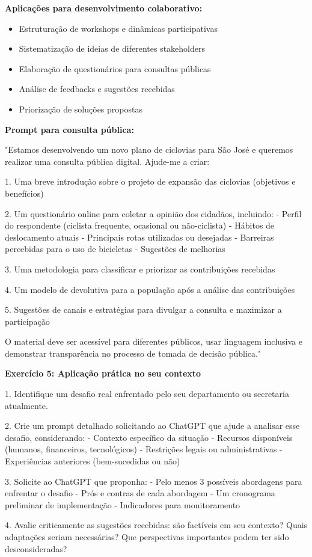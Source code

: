 \documentclass[12pt,a4paper]{book}
\begin{document}
\textbf{Aplicações para desenvolvimento colaborativo:}
\begin{itemize}
    \item Estruturação de workshops e dinâmicas participativas
    \item Sistematização de ideias de diferentes stakeholders
    \item Elaboração de questionários para consultas públicas
    \item Análise de feedbacks e sugestões recebidas
    \item Priorização de soluções propostas
\end{itemize}

\begin{tcolorbox}[exemplo]
\textbf{Prompt para consulta pública:}

"Estamos desenvolvendo um novo plano de ciclovias para São José e queremos realizar uma consulta pública digital. Ajude-me a criar:

1. Uma breve introdução sobre o projeto de expansão das ciclovias (objetivos e benefícios)

2. Um questionário online para coletar a opinião dos cidadãos, incluindo:
   - Perfil do respondente (ciclista frequente, ocasional ou não-ciclista)
   - Hábitos de deslocamento atuais
   - Principais rotas utilizadas ou desejadas
   - Barreiras percebidas para o uso de bicicletas
   - Sugestões de melhorias

3. Uma metodologia para classificar e priorizar as contribuições recebidas

4. Um modelo de devolutiva para a população após a análise das contribuições

5. Sugestões de canais e estratégias para divulgar a consulta e maximizar a participação

O material deve ser acessível para diferentes públicos, usar linguagem inclusiva e demonstrar transparência no processo de tomada de decisão pública."
\end{tcolorbox}

\begin{tcolorbox}[pratica]
\textbf{Exercício 5: Aplicação prática no seu contexto}

1. Identifique um desafio real enfrentado pelo seu departamento ou secretaria atualmente.

2. Crie um prompt detalhado solicitando ao ChatGPT que ajude a analisar esse desafio, considerando:
   - Contexto específico da situação
   - Recursos disponíveis (humanos, financeiros, tecnológicos)
   - Restrições legais ou administrativas
   - Experiências anteriores (bem-sucedidas ou não)
   
3. Solicite ao ChatGPT que proponha:
   - Pelo menos 3 possíveis abordagens para enfrentar o desafio
   - Prós e contras de cada abordagem
   - Um cronograma preliminar de implementação
   - Indicadores para monitoramento

4. Avalie criticamente as sugestões recebidas: são factíveis em seu contexto? Quais adaptações seriam necessárias? Que perspectivas importantes podem ter sido desconsideradas?
\end{tcolorbox}
\end{document}
